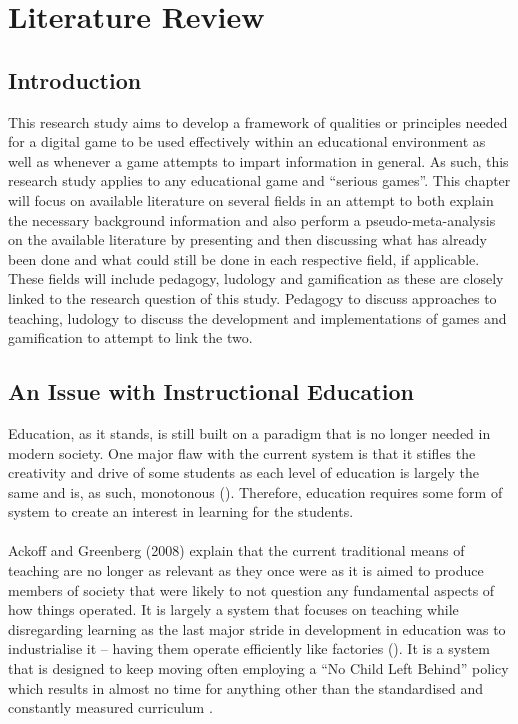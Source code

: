 
\chapter{Literature Review} %

\label{Chapter2} %


\section{Introduction}
This research study aims to develop a framework of qualities or principles needed for a digital game to be used effectively within an educational environment as well as whenever a game attempts to impart information in general. As such, this research study applies to any educational game and “serious games”. This chapter will focus on available literature on several fields in an attempt to both explain the necessary background information and also perform a pseudo-meta-analysis on the available literature by presenting and then discussing what has already been done and what could still be done in each respective field, if applicable. These fields will include pedagogy, ludology and gamification as these are closely linked to the research question of this study. Pedagogy to discuss approaches to teaching, ludology to discuss the development and implementations of games and gamification to attempt to link the two.

\section{An Issue with Instructional Education}
Education, as it stands, is still built on a paradigm that is no longer needed in modern society. One major flaw with the current system is that it stifles the creativity and drive of some students as each level of education is largely the same and is, as such, monotonous (\cite{Ackoff2008}). Therefore, education requires some form of system to create an interest in learning for the students.
\\\\
Ackoff and Greenberg (2008) explain that the current traditional means of teaching are no longer as relevant as they once were as it is aimed to produce members of society that were likely to not question any fundamental aspects of how things operated. It is largely a system that focuses on teaching while disregarding learning as the last major stride in development in education was to industrialise it – having them operate efficiently like factories (\cite{Ackoff2008}). It is a system that is designed to keep moving often employing a “No Child Left Behind” policy which results in almost no time for anything other than the standardised and constantly measured curriculum \citep{gibson2006games}. 



